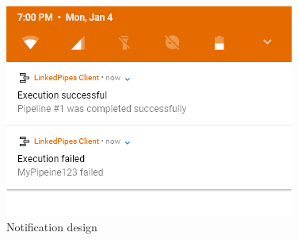 \begin{figure}\centering
    \begin{minipage}[b]{0.7\textwidth}
    	\includegraphics[width=\textwidth]{pics/xd/Notifications.png}
    	\caption[Notifications]{Notification design}\label{fig:xdNotifications}
    \end{minipage}
\end{figure}
